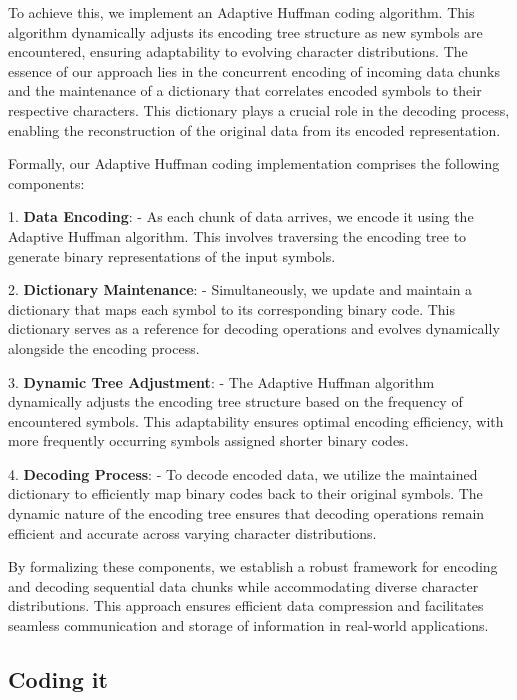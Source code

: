 \documentclass[scrartcl]{article}
\begin{document}
To achieve this, we implement an Adaptive Huffman coding algorithm. This algorithm dynamically adjusts its encoding tree structure as new symbols are encountered, ensuring adaptability to evolving character distributions. The essence of our approach lies in the concurrent encoding of incoming data chunks and the maintenance of a dictionary that correlates encoded symbols to their respective characters. This dictionary plays a crucial role in the decoding process, enabling the reconstruction of the original data from its encoded representation.

Formally, our Adaptive Huffman coding implementation comprises the following components:

1. \textbf{Data Encoding}:
   - As each chunk of data arrives, we encode it using the Adaptive Huffman algorithm. This involves traversing the encoding tree to generate binary representations of the input symbols.

2. \textbf{Dictionary Maintenance}:
   - Simultaneously, we update and maintain a dictionary that maps each symbol to its corresponding binary code. This dictionary serves as a reference for decoding operations and evolves dynamically alongside the encoding process.

3. \textbf{Dynamic Tree Adjustment}:
   - The Adaptive Huffman algorithm dynamically adjusts the encoding tree structure based on the frequency of encountered symbols. This adaptability ensures optimal encoding efficiency, with more frequently occurring symbols assigned shorter binary codes.

4. \textbf{Decoding Process}:
   - To decode encoded data, we utilize the maintained dictionary to efficiently map binary codes back to their original symbols. The dynamic nature of the encoding tree ensures that decoding operations remain efficient and accurate across varying character distributions.

By formalizing these components, we establish a robust framework for encoding and decoding sequential data chunks while accommodating diverse character distributions. This approach ensures efficient data compression and facilitates seamless communication and storage of information in real-world applications.
\subsection{Coding it}
\end{document}
